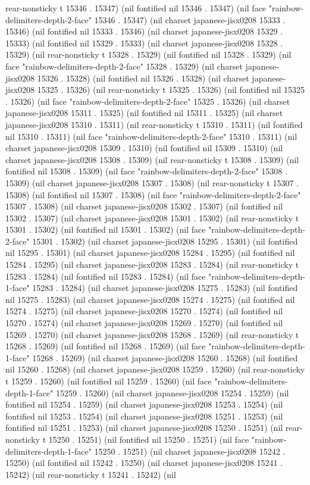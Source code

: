 rear-nonsticky t 15346 . 15347) (nil fontified nil 15346 . 15347) (nil face "rainbow-delimiters-depth-2-face" 15346 . 15347) (nil charset japanese-jisx0208 15333 . 15346) (nil fontified nil 15333 . 15346) (nil charset japanese-jisx0208 15329 . 15333) (nil fontified nil 15329 . 15333) (nil charset japanese-jisx0208 15328 . 15329) (nil rear-nonsticky t 15328 . 15329) (nil fontified nil 15328 . 15329) (nil face "rainbow-delimiters-depth-2-face" 15328 . 15329) (nil charset japanese-jisx0208 15326 . 15328) (nil fontified nil 15326 . 15328) (nil charset japanese-jisx0208 15325 . 15326) (nil rear-nonsticky t 15325 . 15326) (nil fontified nil 15325 . 15326) (nil face "rainbow-delimiters-depth-2-face" 15325 . 15326) (nil charset japanese-jisx0208 15311 . 15325) (nil fontified nil 15311 . 15325) (nil charset japanese-jisx0208 15310 . 15311) (nil rear-nonsticky t 15310 . 15311) (nil fontified nil 15310 . 15311) (nil face "rainbow-delimiters-depth-2-face" 15310 . 15311) (nil charset japanese-jisx0208 15309 . 15310) (nil fontified nil 15309 . 15310) (nil charset japanese-jisx0208 15308 . 15309) (nil rear-nonsticky t 15308 . 15309) (nil fontified nil 15308 . 15309) (nil face "rainbow-delimiters-depth-2-face" 15308 . 15309) (nil charset japanese-jisx0208 15307 . 15308) (nil rear-nonsticky t 15307 . 15308) (nil fontified nil 15307 . 15308) (nil face "rainbow-delimiters-depth-2-face" 15307 . 15308) (nil charset japanese-jisx0208 15302 . 15307) (nil fontified nil 15302 . 15307) (nil charset japanese-jisx0208 15301 . 15302) (nil rear-nonsticky t 15301 . 15302) (nil fontified nil 15301 . 15302) (nil face "rainbow-delimiters-depth-2-face" 15301 . 15302) (nil charset japanese-jisx0208 15295 . 15301) (nil fontified nil 15295 . 15301) (nil charset japanese-jisx0208 15284 . 15295) (nil fontified nil 15284 . 15295) (nil charset japanese-jisx0208 15283 . 15284) (nil rear-nonsticky t 15283 . 15284) (nil fontified nil 15283 . 15284) (nil face "rainbow-delimiters-depth-1-face" 15283 . 15284) (nil charset japanese-jisx0208 15275 . 15283) (nil fontified nil 15275 . 15283) (nil charset japanese-jisx0208 15274 . 15275) (nil fontified nil 15274 . 15275) (nil charset japanese-jisx0208 15270 . 15274) (nil fontified nil 15270 . 15274) (nil charset japanese-jisx0208 15269 . 15270) (nil fontified nil 15269 . 15270) (nil charset japanese-jisx0208 15268 . 15269) (nil rear-nonsticky t 15268 . 15269) (nil fontified nil 15268 . 15269) (nil face "rainbow-delimiters-depth-1-face" 15268 . 15269) (nil charset japanese-jisx0208 15260 . 15268) (nil fontified nil 15260 . 15268) (nil charset japanese-jisx0208 15259 . 15260) (nil rear-nonsticky t 15259 . 15260) (nil fontified nil 15259 . 15260) (nil face "rainbow-delimiters-depth-1-face" 15259 . 15260) (nil charset japanese-jisx0208 15254 . 15259) (nil fontified nil 15254 . 15259) (nil charset japanese-jisx0208 15253 . 15254) (nil fontified nil 15253 . 15254) (nil charset japanese-jisx0208 15251 . 15253) (nil fontified nil 15251 . 15253) (nil charset japanese-jisx0208 15250 . 15251) (nil rear-nonsticky t 15250 . 15251) (nil fontified nil 15250 . 15251) (nil face "rainbow-delimiters-depth-1-face" 15250 . 15251) (nil charset japanese-jisx0208 15242 . 15250) (nil fontified nil 15242 . 15250) (nil charset japanese-jisx0208 15241 . 15242) (nil rear-nonsticky t 15241 . 15242) (nil 